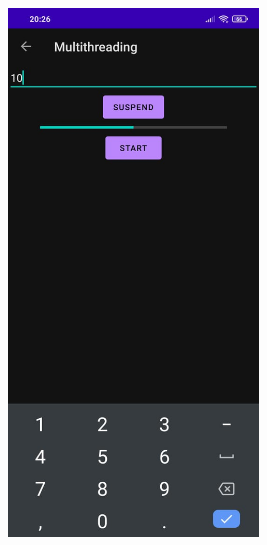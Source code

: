 \documentclass[12pt,letterpaper]{article}
\begin{document}
\begin{figure}
    \centering
    \includegraphics[height=14cm, keepaspectratio]{Outputs/ProgressBar3.jpeg}
\end{figure}
\end{document}
